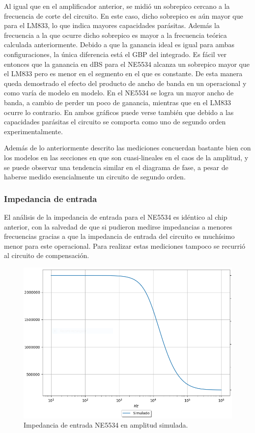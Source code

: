 Al igual que en el amplificador anterior, se midió un sobrepico cercano a la frecuencia de corte del circuito. En este caso, dicho sobrepico es aún mayor que para el LM833, lo que indica mayores capacidades parásitas. Además la frecuencia a la que ocurre dicho sobrepico es mayor a la frecuencia teórica calculada anteriormente. Debido a que la ganancia ideal es igual para ambas configuraciones, la única diferencia está el GBP del integrado. Es fácil ver entonces que la ganancia en dBS para el NE5534 alcanza un sobrepico mayor que el LM833 pero es menor en el segmento en el que es constante. De esta manera queda demostrado el efecto del producto de ancho de banda en un operacional y como varía de modelo en modelo. En el NE5534 se logra un mayor ancho de banda, a cambio de perder un poco de ganancia, mientras que en el LM833 ocurre lo contrario. En ambos gráficos puede verse también que debido a las capacidades parásitas el circuito se comporta como uno de segundo orden experimentalmente.

Además de lo anteriormente descrito las mediciones concuerdan bastante bien con los modelos en las secciones en que son cuasi-lineales en el caos de la amplitud, y se puede observar una tendencia similar en el diagrama de fase, a pesar de haberse medido esencialmente un circuito de segundo orden.

\subsubsection{Impedancia de entrada}
El análisis de la impedancia de entrada para el NE5534 es idéntico al chip anterior, con la salvedad de que si pudieron medirse impedancias a menores frecuencias gracias a que la impedancia de entrada del circuito es muchísimo menor para este operacional. Para realizar estas mediciones tampoco se recurrió al circuito de compensación.


\begin{figure}[H]	
	\centering
	\includegraphics[width=\textwidth]{Ejercicio2/Imagenes/Zin_A_NE5534_Simulado.png}
	\caption{Impedancia de entrada NE5534 en amplitud simulada.}
\end{figure}

